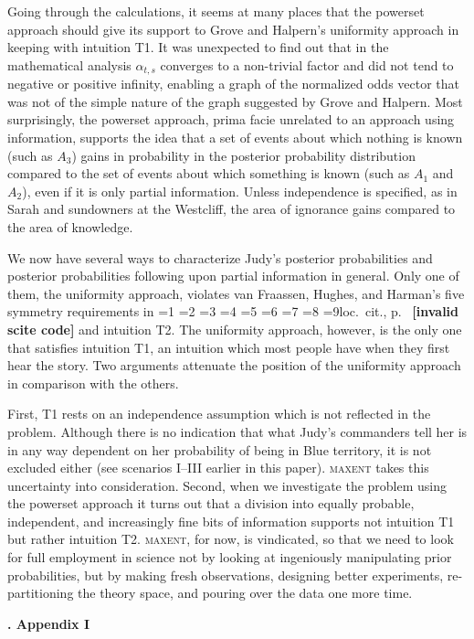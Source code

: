 \documentclass[12pt]{article}
\newcommand{\kapt}[1]{\noindent \textbf{{\thechap}. #1}\addtocounter{chap}{1}}
\newif\ifNumericalOrYear
\newcommand{\PageP}{p.~}
\newcommand{\PageP}{}
\newcommand{\scite}[3]{\ifnum#1=1\ifNumericalOrYear\citep{#2}\else\citeyearpar{#2}\fi\else
\ifnum#1=2\ifNumericalOrYear\citep[#3]{#2}\else\citep[{\PageP}#3]{#2}\fi\else
\ifnum#1=3\ifNumericalOrYear(\citet[#3]{#2})\else\citep[{\PageP}#3]{#2}\fi\else
\ifnum#1=4\ifNumericalOrYear\citet{#2}\else\citet{#2}\fi\else
\ifnum#1=5\ifNumericalOrYear(\citet{#2})\else\citep{#2}\fi\else
\ifnum#1=6\ifNumericalOrYear(\citet[#3]{#2})\else\citep[{\PageP}#3]{#2}\fi\else
\ifnum#1=7\ifNumericalOrYear\citep{#2}\else\citealp{#2}\fi\else
\ifnum#1=8\ifNumericalOrYear\citep[#3]{#2}\else\citealp[{\PageP}#3]{#2}\fi\else
\ifnum#1=9\ifNumericalOrYear\citep[#3]{#2}\else{}loc.\ cit., {\PageP}#3\fi\else
\textbf{[invalid scite code]}\fi\fi\fi\fi\fi\fi\fi\fi\fi}
\begin{document}
Going through the calculations, it seems at many places that the
powerset approach should give its support to Grove and Halpern's
uniformity approach in keeping with intuition T1. It was unexpected to
find out that in the mathematical analysis $\alpha_{t,s}$ converges to
a non-trivial factor and did not tend to negative or positive
infinity, enabling a graph of the normalized odds vector that was not
of the simple nature of the graph suggested by Grove and Halpern. Most
surprisingly, the powerset approach, prima facie unrelated to an
approach using information, supports the idea that a set of events
about which nothing is known (such as $A_{3}$) gains in probability in
the posterior probability distribution compared to the set of events
about which something is known (such as $A_{1}$ and $A_{2}$), even if
it is only partial information. Unless independence is specified, as
in Sarah and sundowners at the Westcliff, the area of ignorance gains
compared to the area of knowledge.

We now have several ways to characterize Judy's posterior
probabilities and posterior probabilities following upon partial
information in general. Only one of them, the uniformity approach,
violates van Fraassen, Hughes, and Harman's five symmetry requirements
in \scite{1}{fraassenetal86}{} and intuition T2. The uniformity
approach, however, is the only one that satisfies intuition T1, an
intuition which most people have when they first hear the story. Two
arguments attenuate the position of the uniformity approach in
comparison with the others. 

First, T1 rests on an independence assumption which is not reflected
in the problem. Although there is no indication that what Judy's
commanders tell her is in any way dependent on her probability of
being in Blue territory, it is not excluded either (see scenarios
I--III earlier in this paper). \textsc{maxent} takes this uncertainty
into consideration. Second, when we investigate the problem using the
powerset approach it turns out that a division into equally probable,
independent, and increasingly fine bits of information supports not
intuition T1 but rather intuition T2. \textsc{maxent}, for now, is
vindicated, so that we need to look for full employment in science not
by looking at ingeniously manipulating prior probabilities, but by
making fresh observations, designing better experiments,
re-partitioning the theory space, and pouring over the data one more
time.

\newpage

\kapt{Appendix I}
\end{document}
